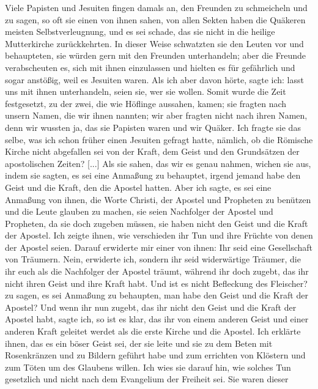 Viele Papisten und Jesuiten fingen damals an, den Freunden
zu schmeicheln und zu sagen, so oft sie einen von ihnen sahen,
von allen Sekten haben die Quäkeren meisten Selbstverleugnung,
und es sei schade, das sie nicht in die heilige Mutterkirche 
zurückkehrten. In dieser Weise schwatzten sie den Leuten vor und 
behaupteten, sie würden gern mit den Freunden unterhandeln; aber
die Freunde verabscheuten es, sich mit ihnen einzulassen und
hielten es für gefährlich und sogar anstößig, weil es Jesuiten
waren. Als ich aber davon hörte, sagte ich: \glqq lasst uns mit ihnen
unterhandeln, seien sie, wer sie wollen.\grqq{} Somit wurde die Zeit
festgesetzt, zu der zwei, die wie Höflinge aussahen, kamen; sie
fragten nach unsern Namen, die wir ihnen nannten; wir aber
fragten nicht nach ihren Namen, denn wir wussten ja, das sie
Papisten waren und wir Quäker. Ich fragte sie das selbe, was
ich schon früher einen Jesuiten gefragt hatte, nämlich, ob die
Römische Kirche nicht abgefallen sei von der Kraft, dem Geist
und den Grundsätzen der apostolischen Zeiten? [...] Als sie
sahen, das wir es genau nahmen, wichen sie aus, indem sie sagten,
es sei eine Anmaßung zu behauptet, irgend jemand habe den
Geist und die Kraft, den die Apostel hatten. Aber ich sagte, es
sei eine Anmaßung von ihnen, die Worte Christi, der Apostel und
Propheten zu benützen und die Leute glauben zu machen, sie seien
Nachfolger der Apostel und Propheten, da sie doch zugeben müssen,
sie haben nicht den Geist und die Kraft der Apostel. Ich zeigte
ihnen, wie verschieden ihr Tun und ihre Früchte von denen der
Apostel seien. Darauf erwiderte mir einer von ihnen: \glqq Ihr seid
eine Gesellschaft von Träumern.\grqq{} \glqq Nein,\grqq{} erwiderte ich, 
\glqq sondern ihr seid widerwärtige Träumer, die ihr euch als die 
Nachfolger der Apostel träumt, während ihr doch zugebt, das ihr nicht ihren
Geist und ihre Kraft habt. Und ist es nicht Befleckung des Fleischer?
zu sagen, es sei Anmaßung zu behaupten, man habe den Geist
und die Kraft der Apostel? Und wenn ihr nun zugebt, das ihr
nicht den Geist und die Kraft der Apostel habt,\grqq{} sagte ich, \glqq 
so ist es klar, das ihr von einem anderen Geist und einer anderen
Kraft geleitet werdet als die erste Kirche und die Apostel.\grqq{} Ich
erklärte ihnen, das es ein böser Geist sei, der sie leite und sie zu
dem Beten mit Rosenkränzen und zu Bildern geführt habe und
zum errichten von Klöstern  und zum Töten um des Glaubens
willen. Ich wies sie darauf hin, wie solches Tun gesetzlich und
nicht nach dem Evangelium der Freiheit sei. Sie waren dieser
